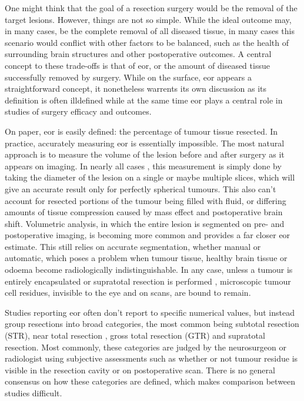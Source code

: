 One might think that the goal of a resection surgery would be the removal of the target lesions.
However, things are not so simple.
While the ideal outcome may, in many cases, be the complete removal of all diseased tissue, in many cases this scenario would conflict with other factors to be balanced, such as the health of surrounding brain structures and other postoperative outcomes.
A central concept to these trade-offs is that of \gls{eor}, or the amount of diseased tissue  successfully removed by surgery.
While on the surface, \gls{eor} appears a straightforward concept, it nonetheless warrents its own discussion as its definition is often illdefined while at the same time \gls{eor} plays a central role in studies of surgery efficacy and outcomes.

On paper, \gls{eor} is easily defined: the percentage of tumour tissue resected.
In practice, accurately measuring \gls{eor} is essentially impossible.
The most natural approach is to measure the volume of the lesion before and after surgery as it appears on imaging.
In nearly all cases , this measurement is simply done by taking the diameter of the lesion on a single or maybe multiple slices, which will give an accurate result only for perfectly spherical tumours.
This also can't account for resected portions of the tumour being filled with fluid, or differing amounts of tissue compression caused by mass effect and postoperative brain shift.
Volumetric analysis, in which the entire lesion is segmented on pre- and postoperative imaging, is becoming more common and provides a far closer \gls{eor} estimate.
This still relies on accurate segmentation, whether manual or automatic, which poses a problem when tumour tissue, healthy brain tissue or odoema become radiologically indistinguishable.
In any case, unless a tumour is entirely encapsulated  or supratotal resection is performed , microscopic tumour cell residues, invisible to the eye and on scans, are bound to remain.

Studies reporting \gls{eor} often don't report to specific numerical values, but instead group resections into broad categories, the most common being subtotal resection (STR), near total resection , gross total resection (GTR) and supratotal resection.
Most commonly, these categories are judged by the neurosurgeon or radiologist using subjective assessments such as whether or not tumour residue is visible in the resection cavity or on postoperative scan.
There is no general consensus on how these categories are defined, which makes comparison between studies difficult.

